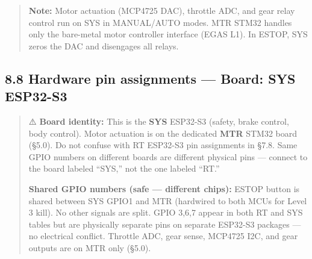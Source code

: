 \begin{quote}
\textbf{Note:} Motor actuation (MCP4725 DAC), throttle ADC, and gear relay
control run on SYS in MANUAL/AUTO modes. MTR STM32 handles only the bare-metal
motor controller interface (EGAS L1). In ESTOP, SYS zeros the DAC and disengages
all relays.
\end{quote}

\subsection{8.8 Hardware pin assignments --- Board: SYS
ESP32-S3}\label{hardware-pin-assignments-board-sys-esp32-s3}

\begin{quote}
⚠️ \textbf{Board identity:} This is the \textbf{SYS} ESP32-S3 (safety, brake
control, body control). Motor actuation is on the dedicated \textbf{MTR} STM32
board (§5.0). Do not confuse with RT ESP32-S3 pin assignments in §7.8. Same GPIO
numbers on different boards are different physical pins --- connect to the board
labeled ``SYS,'' not the one labeled ``RT.''

\textbf{Shared GPIO numbers (safe --- different chips):} ESTOP button is shared
between SYS GPIO1 and MTR (hardwired to both MCUs for Level 3 kill). No other
signals are split. GPIO 3,6,7 appear in both RT and SYS tables but are
physically separate pins on separate ESP32-S3 packages --- no electrical
conflict. Throttle ADC, gear sense, MCP4725 I2C, and gear outputs are on MTR
only (§5.0).
\end{quote}

